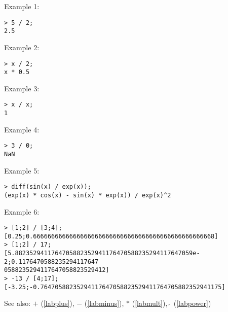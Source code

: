 \noindent Example 1: 
\begin{center}\begin{minipage}{15cm}\begin{Verbatim}[frame=single]
> 5 / 2;
2.5
\end{Verbatim}
\end{minipage}\end{center}
\noindent Example 2: 
\begin{center}\begin{minipage}{15cm}\begin{Verbatim}[frame=single]
> x / 2;
x * 0.5
\end{Verbatim}
\end{minipage}\end{center}
\noindent Example 3: 
\begin{center}\begin{minipage}{15cm}\begin{Verbatim}[frame=single]
> x / x;
1
\end{Verbatim}
\end{minipage}\end{center}
\noindent Example 4: 
\begin{center}\begin{minipage}{15cm}\begin{Verbatim}[frame=single]
> 3 / 0;
NaN
\end{Verbatim}
\end{minipage}\end{center}
\noindent Example 5: 
\begin{center}\begin{minipage}{15cm}\begin{Verbatim}[frame=single]
> diff(sin(x) / exp(x));
(exp(x) * cos(x) - sin(x) * exp(x)) / exp(x)^2
\end{Verbatim}
\end{minipage}\end{center}
\noindent Example 6: 
\begin{center}\begin{minipage}{15cm}\begin{Verbatim}[frame=single]
> [1;2] / [3;4];
[0.25;0.66666666666666666666666666666666666666666666666668]
> [1;2] / 17;
[5.8823529411764705882352941176470588235294117647059e-2;0.1176470588235294117647
0588235294117647058823529412]
> -13 / [4;17];
[-3.25;-0.76470588235294117647058823529411764705882352941175]
\end{Verbatim}
\end{minipage}\end{center}
See also: \textbf{$+$} (\ref{labplus}), \textbf{$-$} (\ref{labminus}), \textbf{$*$} (\ref{labmult}), \textbf{$\mathbf{\hat{~}}$} (\ref{labpower})
